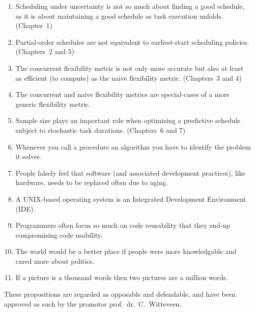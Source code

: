 \documentclass[print,nativefonts]{dissertation}
\begin{document}
\begin{enumerate}[1.]
	\item Scheduling under uncertainty is not so much about finding a good schedule, as it is about maintaining a good schedule as task execution unfolds. (Chapter~1)

	\item Partial-order schedules are not equivalent to earliest-start scheduling policies. (Chapters~2 and 5)

	\item The concurrent flexibility metric is not only more accurate but also at least as efficient (to compute) as the naive flexibility metric. (Chapters~3 and 4)

	\item The concurrent and naive flexibility metrics are special-cases of a more generic flexibility metric.

	\item Sample size plays an important role when optimizing a predictive schedule subject to stochastic task durations. (Chapters~6 and 7)

	\item Whenever you call a procedure an algorithm you have to identify the problem it solves.

	\item People falsely feel that software (and associated development practices), like hardware, needs to be replaced often due to aging.

	\item A UNIX-based operating system is an Integrated Development Environment (IDE).

	\item Programmers often focus so much on code reusability that they end-up compromising code usability.

	\item The world would be a better place if people were more knowledgable and cared more about politics.


	\item If a picture is a thousand words then two pictures are a million words. 
\end{enumerate}

\bigskip
\bigskip

\begin{center}
These propositions are regarded as opposable and defendable, and have been approved as such by the promotor prof.\ dr.\ C.\ Witteveen.
\end{center}
\end{document}
